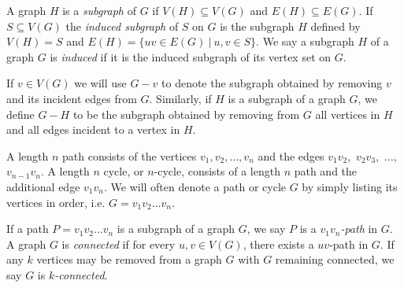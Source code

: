 \documentclass[letterpaper, 12pt]{article}
\theoremstyle{definition}
\theoremstyle{definition}
\theoremstyle{thm}
\theoremstyle{definition}
\begin{document}
A graph $H$ is a \textit{subgraph} of $G$ if $V(H)\subseteq V(G)$ and
$E(H)\subseteq E(G)$. If $S\subseteq V(G)$ the \textit{induced subgraph} of
$S$ on $G$ is the subgraph $H$ defined by $V(H)=S$ and
$E(H)=\{uv\in E(G) \ | \ u,v\in S\}$. We say a subgraph $H$ of a graph $G$ is
\textit{induced} if it is the induced subgraph of its vertex set on $G$.

If $v\in V(G)$ we will use $G-v$ to denote the subgraph obtained by removing $v$
and its incident edges from $G$. Similarly, if $H$ is a subgraph of a graph $G$,
we define $G-H$ to be the subgraph obtained by removing from $G$ all vertices in
$H$ and all edges incident to a vertex in $H$.

A length $n$ path consists of the vertices $v_1,v_2,\ldots,v_n$ and the edges
$v_1v_2,$ $v_2v_3,$ $\ldots,$ $v_{n-1}v_n$. A length $n$ cycle, or $n$-cycle, consists of
a length $n$ path and the additional edge $v_1v_n$. We will often denote a path
or cycle $G$ by simply listing its vertices in order, i.e. $G=v_1v_2\ldots v_n$.

If a path $P=v_1v_2\ldots v_n$ is a subgraph of a graph $G$, we say $P$ is a
\textit{$v_1v_n$-path} in $G$. A graph $G$ is \textit{connected} if for every
$u,v\in V(G)$, there exists a $uv$-path in $G$. If any $k$ vertices may be
removed from a graph $G$ with $G$ remaining connected, we say $G$ is
\textit{$k$-connected}.
\end{document}
